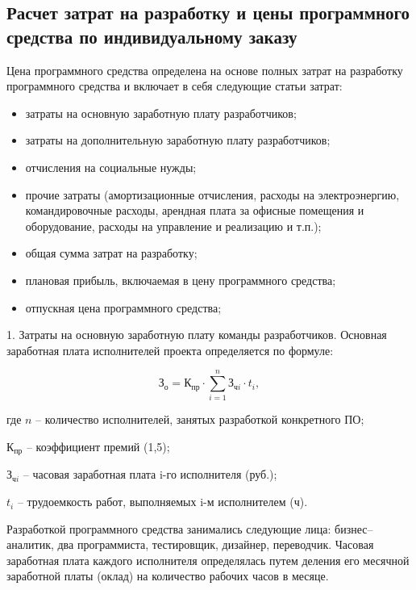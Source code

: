 \subsection{Расчет затрат на разработку и цены программного средства по индивидуальному заказу}

Цена программного средства определена на основе полных затрат на разработку программного средства и включает в себя следующие статьи затрат: 
\begin{itemize}
    \item затраты на основную заработную плату разработчиков;
    \item затраты на дополнительную заработную плату разработчиков;
    \item отчисления на социальные нужды;
    \item прочие затраты (амортизационные отчисления, расходы на электроэнергию, командировочные расходы, арендная плата за офисные помещения и оборудование, расходы на управление и реализацию и т.п.);
    \item общая сумма затрат на разработку;
    \item плановая прибыль, включаемая в цену программного средства;
    \item отпускная цена программного средства;
\end{itemize}

1. Затраты на основную заработную плату команды разработчиков.
Основная заработная плата исполнителей проекта определяется по формуле:

\begin{equation}
    \mbox{З}_{\mbox{о}}=\mbox{К}_{\mbox{пр}}\cdot \sum_{i=1}^{n}{\mbox{З}_{\mbox{ч}i}\cdot t_{i}},
\end{equation}

где	$n$ -- количество исполнителей, занятых разработкой конкретного ПО;

    $\mbox{К}_{\mbox{пр}}$ -- коэффициент премий (1,5); 
    
    $\mbox{З}_{\mbox{ч}i}$ -- часовая заработная плата i-го исполнителя (руб.); 
    
    $t_{i}$ -- трудоемкость работ, выполняемых i-м исполнителем (ч).
    

Разработкой программного средства занимались следующие лица: бизнес–аналитик, два программиста, тестировщик, дизайнер, переводчик. Часовая заработная плата каждого исполнителя определялась путем деления его месячной заработной платы (оклад) на количество рабочих часов в месяце.

